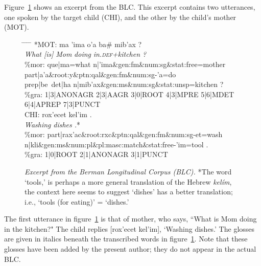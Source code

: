 Figure~\ref{fig:excerpt} shows an excerpt from the \ac{BLC}. 
This excerpt contains two utterances, one spoken by the 
target child (CHI), and the other by the child's mother (MOT).
\begin{figure}[ht]
\vspace{10pt}
\label{fig:excerpt}
\caption{\emph{Excerpt from the Berman Longitudinal Corpus (BLC).} *The word `tools,' is perhaps a more general translation of the Hebrew \textit{kel\'{i}m}, the context here seems to suggest `dishes' 
has a better translation; i.e., `tools (for eating)' = `dishes.' } 
\vspace{-12pt}\begin{tabbing}
\small
\hspace{0.6in} \= \hspace{0.6in} \=  \hspace{0.5in} \= \hspace{0.6in} \= \hspace{3.4in} \kill
\textsf{*MOT:} \> \textsf{ma} \> \textsf{\a'{i}ma} \> \textsf{o\a'{a}} \>  \textsf{ba\# mib\a'{a}x ?} \\
\> \textit{What [is]} \> \textit{Mom} \> \textit{doing} \> \textit{in.\textsc{def}+kitchen ?} \\
\textsf{\%mor:} \> \textsf{que|ma=what n|\a'{i}ma\&gen:fm\&num:sg\&stat:free=mother} \\
 \> \textsf{part|a\a'{a}\&root:y\&ptn:qal\&gen:fm\&num:sg-\a'{a}=do} \\
   \> \textsf{prep|be~det|ha n|mib\a'{a}x\&gen:ms\&num:sg\&stat:unsp=kitchen ?}\\
\textsf{\%gra:} \>	\textsf{1|3|ANONAGR 2|3|AAGR 3|0|ROOT 4|3|MPRE 5|6|MDET 6|4|APREP 7|3|PUNCT}\\
\textsf{CHI:} \> \textsf{rox\a'{e}cet} \> \textsf{kel\a'{i}m .}\\
		\> \textit{Washing} \> \textit{dishes .}*  \\
\textsf{\%mor:} \> \textsf{part|rax\a'{a}c\&root:rxc\&ptn:qal\&gen:fm\&num:sg-et=wash} \\ 
    \>  \textsf{n|kli}\&\textsf{gen:ms\&num:pl\&pl:masc:match\&stat:free-\a'{i}m=tool .} \\ 
\textsf{\%gra:} \> \textsf{1|0|ROOT 2|1|ANONAGR 3|1|PUNCT}
\end{tabbing}
\end{figure}
The first utterance in figure~\ref{fig:excerpt} is that of mother,
who says, ``What is Mom doing in the kitchen?" The child
replies \textsf{[rox\a'{e}cet kel\a'{i}m]}, `Washing dishes.' 
The glosses are given in 
italics beneath the transcribed words in figure~\ref{fig:excerpt}. Note that 
these glosses have been added by the present author; 
they do not appear in the actual \ac{BLC}.

